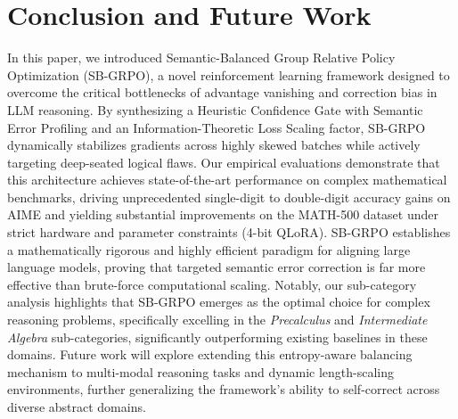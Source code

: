 \section{Conclusion and Future Work}
In this paper, we introduced Semantic-Balanced Group Relative Policy Optimization (SB-GRPO), a novel reinforcement learning framework designed to overcome the critical bottlenecks of advantage vanishing and correction bias in LLM reasoning. By synthesizing a Heuristic Confidence Gate with Semantic Error Profiling and an Information-Theoretic Loss Scaling factor, SB-GRPO dynamically stabilizes gradients across highly skewed batches while actively targeting deep-seated logical flaws. Our empirical evaluations demonstrate that this architecture achieves state-of-the-art performance on complex mathematical benchmarks, driving unprecedented single-digit to double-digit accuracy gains on AIME and yielding substantial improvements on the MATH-500 dataset under strict hardware and parameter constraints (4-bit QLoRA). SB-GRPO establishes a mathematically rigorous and highly efficient paradigm for aligning large language models, proving that targeted semantic error correction is far more effective than brute-force computational scaling. Notably, our sub-category analysis highlights that SB-GRPO emerges as the optimal choice for complex reasoning problems, specifically excelling in the \textit{Precalculus} and \textit{Intermediate Algebra} sub-categories, significantly outperforming existing baselines in these domains. 
Future work will explore extending this entropy-aware balancing mechanism to multi-modal reasoning tasks and dynamic length-scaling environments, further generalizing the framework's ability to self-correct across diverse abstract domains.